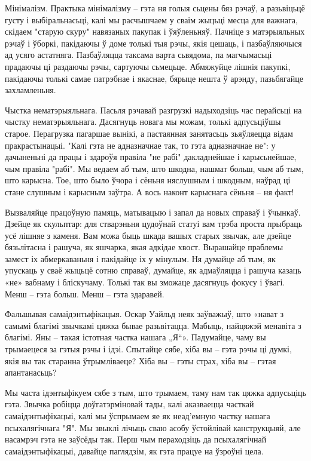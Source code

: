 Мінімалізм. Практыка мінімалізму – гэта ня голыя сьцены бяз рэчаў, а разьвіцьцё густу і выбіральнасьці, калі мы расчышчаем у сваім жыцьці месца для важнага, скідаем "старую скуру" навязаных пакупак і ўяўленьняў. Пачніце з матэрыяльных рэчаў і ўборкі, пакідаючы ў доме толькі тыя рэчы, якія цешаць, і пазбаўляючыся ад усяго астатняга. Пазбаўляцца таксама варта сьвядома, па магчымасьці прадаючы ці раздаючы рэчы, сартуючы сьмецьце. Абмяжуйце лішнія пакупкі, пакідаючы толькі самае патрэбнае і якаснае, бярыце нешта ў арэнду, пазьбягайце захламленьня.

Чыстка нематэрыяльнага. Пасьля рэчавай разгрузкі надыходзіць час перайсьці на чыстку нематэрыяльнага. Дасягнуць новага мы можам, толькі адпусьціўшы старое. Перагрузка пагаршае вынікі, а пастаянная занятасьць зьяўляецца відам пракрастынацыі. "Калі гэта не адназначнае так, то гэта адназначнае не": у дачыненьні да працы і здароўя правіла "не рабі" дакладнейшае і карысьнейшае, чым правіла "рабі". Мы ведаем аб тым, што шкодна, нашмат больш, чым аб тым, што карысна. Тое, што было ўчора і сёньня няслушным і шкодным, наўрад ці стане слушным і карысным заўтра. А вось наконт карыснага сёньня – ня факт!

Вызваляйце працоўную памяць, матывацыю і запал да новых справаў і ўчынкаў. Дзейце як скульптар: для стварэньня цудоўнай статуі вам трэба проста прыбраць усё лішняе з каменя. Вам можа быць шкада вашых старых звычак, але дзейце бязьлітасна і рашуча, як яшчарка, якая адкідае хвост. Вырашайце праблемы замест іх абмеркаваньня і пакідайце іх у мінулым. Ня думайце аб тым, як упускаць у сваё жыцьцё сотню справаў, думайце, як адмаўляцца і рашуча казаць «не» вабнаму і бліскучаму. Толькі так вы зможаце дасягнуць фокусу і ўвагі. Менш – гэта больш. Менш – гэта здаравей.

Фальшывая самаідэнтыфікацыя. Оскар Уайльд неяк заўважыў, што «нават з самымі благімі звычкамі цяжка бывае разьвітацца. Мабыць, найцяжэй менавіта з благімі. Яны – такая істотная частка нашага „Я“». Падумайце, чаму вы трымаецеся за гэтыя рэчы і ідэі. Спытайце сябе, хіба вы – гэта рэчы ці думкі, якія вы так старанна ўтрымліваеце? Хіба вы – гэты страх, хіба вы – гэтая апантанасьць?

Мы часта ідэнтыфікуем сябе з тым, што трымаем, таму нам так цяжка адпусьціць гэта. Звычка робіцца доўгатэрміновай тады, калі аказваецца часткай самаідэнтыфікацыі, калі мы ўспрымаем яе як неад'емную частку нашага псыхалягічнага "Я". Мы звыклі лічыць сваю асобу ўстойлівай канструкцыяй, але насамрэч гэта не заўсёды так. Перш чым пераходзіць да псыхалягічнай самаідэнтыфікацыі, давайце паглядзім, як гэта працуе на ўзроўні цела.

